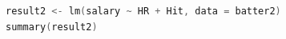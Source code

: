 \begin{lstlisting}[language=c++,label={code:11_07},caption={Execution of multiple regression analysis}]
result2 <- lm(salary ~ HR + Hit, data = batter2)
summary(result2)
\end{lstlisting}
